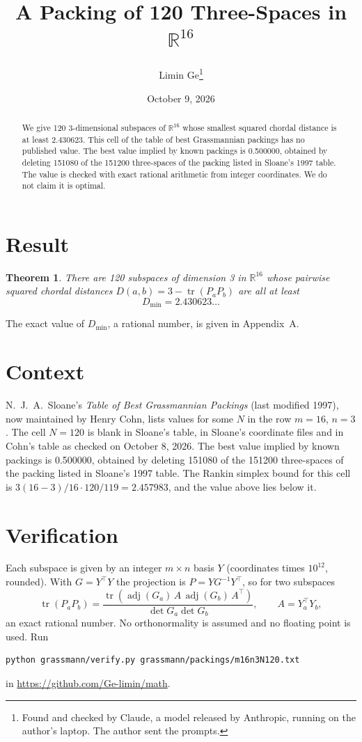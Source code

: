 \documentclass[11pt,a4paper]{article}
\title{A Packing of 120 Three-Spaces in $\mathbb{R}^{16}$}
\author{Limin Ge\thanks{Found and checked by Claude, a model released by Anthropic, running on the author's laptop. The author sent the prompts.}}
\date{October 9, 2026}
\newtheorem*{theorem}{Theorem}
\begin{document}
\maketitle
\begin{abstract}
We give 120 3-dimensional subspaces of $\mathbb{R}^{16}$ whose smallest squared chordal distance is at least 2.430623. This cell of the table of best Grassmannian packings has no published value. The best value implied by known packings is 0.500000, obtained by deleting 151080 of the 151200 three-spaces of the packing listed in Sloane's 1997 table. The value is checked with exact rational arithmetic from integer coordinates. We do not claim it is optimal.
\end{abstract}

\section{Result}
\begin{theorem}
There are 120 subspaces of dimension 3 in $\mathbb{R}^{16}$ whose pairwise squared chordal distances $D(a,b) = 3 - \operatorname{tr}(P_aP_b)$ are all at least
\[ D_{\min} = 2.430623\ldots \]
\end{theorem}
The exact value of $D_{\min}$, a rational number, is given in Appendix~A.


\section{Context}
N.~J.~A.~Sloane's \emph{Table of Best Grassmannian Packings} (last modified 1997), now maintained by Henry Cohn, lists values for some $N$ in the row $m=16$, $n=3$. The cell $N=120$ is blank in Sloane's table, in Sloane's coordinate files and in Cohn's table as checked on October 8, 2026. The best value implied by known packings is 0.500000, obtained by deleting 151080 of the 151200 three-spaces of the packing listed in Sloane's 1997 table. The Rankin simplex bound for this cell is $3(16-3)/16\cdot 120/119 = 2.457983$, and the value above lies below it.


\section{Verification}
Each subspace is given by an integer $m\times n$ basis $Y$ (coordinates times $10^{12}$, rounded). With $G=Y^\top Y$ the projection is $P=YG^{-1}Y^\top$, so for two subspaces
\[ \operatorname{tr}(P_aP_b)=\frac{\operatorname{tr}(\operatorname{adj}(G_a)\,A\,\operatorname{adj}(G_b)\,A^\top)}{\det G_a\det G_b},\qquad A=Y_a^\top Y_b, \]
an exact rational number. No orthonormality is assumed and no floating point is used. Run
\begin{verbatim}
python grassmann/verify.py grassmann/packings/m16n3N120.txt
\end{verbatim}
in \url{https://github.com/Ge-limin/math}.
\end{document}
